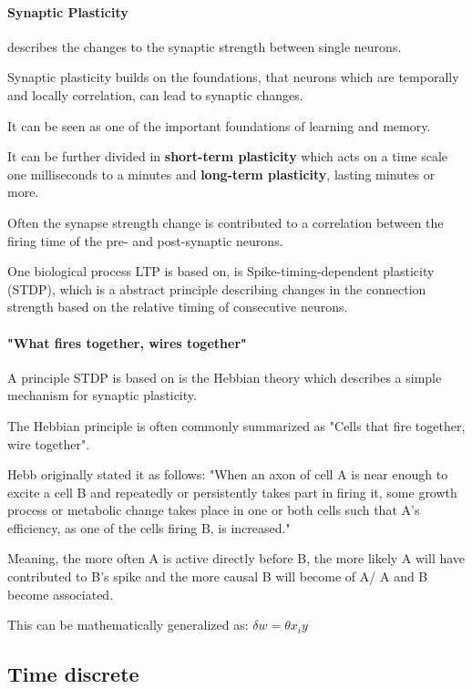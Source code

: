 \paragraph{Synaptic Plasticity} describes the changes to the synaptic strength between single neurons. 

Synaptic plasticity builds on the foundations, that neurons which are temporally and locally correlation, can lead to synaptic changes.

It can be seen as one of the important foundations of learning and memory.

It can be further divided in \textbf{short-term plasticity} which acts on a time scale one milliseconds to a minutes and \textbf{long-term plasticity}, lasting minutes or more.

Often the synapse strength change is contributed to a correlation between the firing time of the pre- and post-synaptic neurons.

One biological process LTP is based on, is Spike-timing-dependent plasticity (STDP), which is a abstract principle describing changes in the connection strength based on the relative timing of consecutive neurons.

\paragraph{"What fires together, wires together"} A principle STDP is based on is the Hebbian theory which describes a simple mechanism for synaptic plasticity.

The Hebbian principle is often commonly summarized as "Cells that fire together, wire together".

Hebb originally stated it as follows: "When an axon of cell A is near enough to excite a cell B and repeatedly or persistently takes part in firing it, some growth process or metabolic change takes place in one or both cells such that A's efficiency, as one of the cells firing B, is increased."

Meaning, the more often A is active directly before B, the more likely A will have contributed to B's spike and the more causal B will become of A/ A and B become associated.

This can be mathematically generalized as: $\delta w = \theta x_i y $ 


\subsection{Time discrete}

